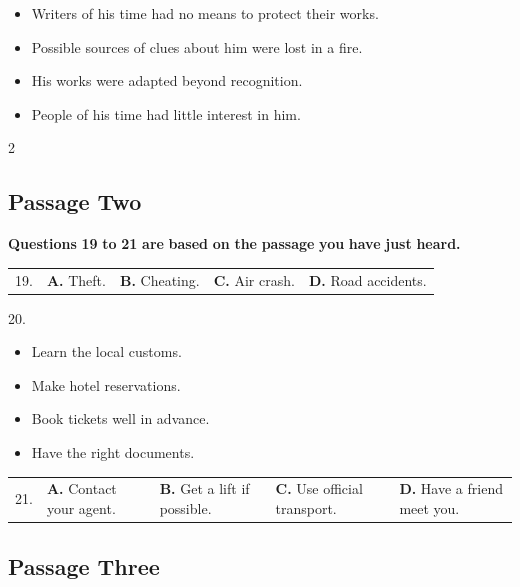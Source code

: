 \documentclass[UTF8,11pt]{ctexart}
\begin{document}
\begin{itemize}[leftmargin=2em,itemsep=.2em,topsep=.4em]\item[A.] Writers of his time had no means to protect their works.
\item[B.] Possible sources of clues about him were lost in a fire.
\item[C.] His works were adapted beyond recognition.
\item[D.] People of his time had little interest in him.
\end{itemize}

2


\subsection*{Passage Two}


\textbf{Questions} \textbf{19} \textbf{to} \textbf{21} \textbf{are} \textbf{based} \textbf{on} \textbf{the} \textbf{passage} \textbf{you} \textbf{have} \textbf{just} \textbf{heard.}


\noindent\begin{tabularx}{\linewidth}{@{}lXXXX@{}}19. & \textbf{A.} Theft. & \textbf{B.} Cheating. & \textbf{C.} Air crash. & \textbf{D.} Road accidents.\\\end{tabularx}\par

20.


\begin{itemize}[leftmargin=2em,itemsep=.2em,topsep=.4em]\item[A.] Learn the local customs.
\item[B.] Make hotel reservations.
\item[C.] Book tickets well in advance.
\item[D.] Have the right documents.
\end{itemize}

\noindent\begin{tabularx}{\linewidth}{@{}lXXXX@{}}21. & \textbf{A.} Contact your agent. & \textbf{B.} Get a lift if possible. & \textbf{C.} Use official transport. & \textbf{D.} Have a friend meet you.\\\end{tabularx}\par

\subsection*{Passage Three}
\end{document}
